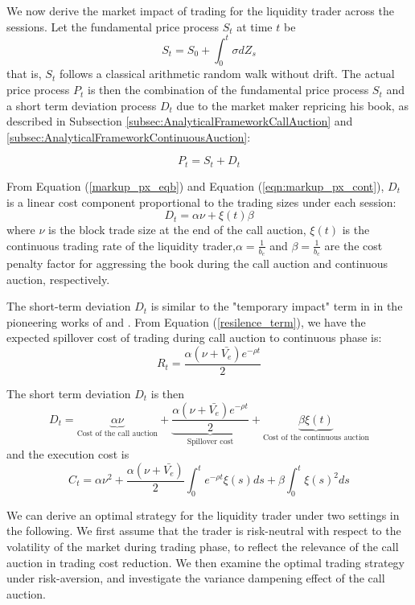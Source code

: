 We now derive the market impact of trading for the liquidity trader across the sessions. Let the fundamental price process $S_t$ at time $t$ be
\[
  S_t = S_0 + \int_0^t \sigma dZ_s
\]
that is, $S_t$ follows a classical arithmetic random walk without drift. The actual price process $P_t$ is then the combination of the fundamental price process $S_t$ and a short term deviation process $D_t$ due to the market maker repricing his book, as described in Subsection \ref{subsec:AnalyticalFrameworkCallAuction} and \ref{subsec:AnalyticalFrameworkContinuousAuction}:

\[
  P_t = S_t + D_t
\]

From Equation (\ref{markup_px_eqb}) and Equation (\ref{eqn:markup_px_cont}), $D_t$ is a linear cost component proportional to the trading sizes under each session:
\begin{equation}\label{short_term_deviation}
  D_t = \alpha \nu + \xi(t) \beta
\end{equation}
where $\nu$ is the block trade size at the end of the call auction, $\xi(t)$ is the continuous trading rate of the liquidity trader,$\alpha=\frac{1}{b_e}$ and $\beta=\frac{1}{b_c}$ are the cost penalty factor for aggressing the book during the call auction and continuous auction, respectively.

The short-term deviation $D_t$ is similar to the "temporary impact" term in in the pioneering works of \cite{BertimasLo1999} and \cite{Almgren2000}. From Equation (\ref{resilence_term}), we have the expected spillover cost of trading during call auction to continuous phase is:
\[
  R_t = \frac{\alpha (\nu + \bar{V_e}) e^{-\rho t}}{2}
\]

The short term deviation $D_t$ is then
\[
  D_t = \underbrace{\alpha \nu }_\text{Cost of the call auction} +
  \underbrace{\frac{\alpha (\nu + \bar{V_e}) e^{-\rho t}}{2}}_\text{Spillover cost} +  \underbrace{\beta \xi(t)}_\text{Cost of the continuous auction}
\]
and the execution cost is
\begin{equation}\label{eqn:cost_equation_all}
  C_t = \alpha \nu^2 + \frac{\alpha (\nu + \bar{V_e})}{2} \int_0^t e^{-\rho t} \xi(s) ds + \beta \int_0^t \xi(s)^2 ds
\end{equation}

We can derive an optimal strategy for the liquidity trader under two settings in the following. We first assume that the trader is risk-neutral with respect to the volatility of the market during trading phase, to reflect the relevance of the call auction in trading cost reduction. We then examine the optimal trading strategy under risk-aversion, and investigate the variance dampening effect of the call auction.

